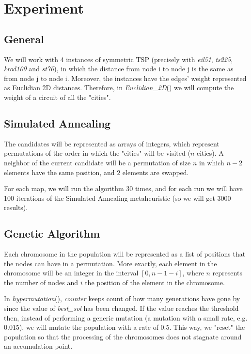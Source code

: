 \documentclass[a4paper]{article}
\begin{document}
\section{Experiment}

\subsection{General}

We will work with 4 instances of symmetric TSP (precisely with \textit{eil51}\cite{instances}, \textit{ts225}\cite{instances}, \textit{krod100}\cite{instances} and \textit{st70}\cite{instances}), in which the distance from node i to node j is the same as from node j to node i. Moreover, the instances have the edges' weight represented as Euclidian 2D distances. Therefore, in {\itshape Euclidian\_2D}() we will compute the weight of a circuit of all the "cities".

\subsection{Simulated Annealing}

The candidates will be represented as arrays of integers, which represent permutations of the order in which the "cities" will be visited ($n$ cities). A neighbor of the current candidate will be a permutation of size $n$ in which $n-2$ elements have the same position, and $2$ elements are swapped.

For each map, we will run the algorithm 30 times, and for each run we will have 100 iterations of the Simulated Annealing metaheuristic (so we will get $3000$ results).

\subsection{Genetic Algorithm}

Each chromosome in the population will be represented as a list of positions that the nodes can have in a permutation. More exactly, each element in the chromosome will be an integer in the interval $[0,n-1-i]$, where $n$ represents the number of nodes and $i$ the position of the element in the chromosome.

In {\itshape hypermutation}(), {\itshape counter} keeps count of how many generations have gone by since the value of {\itshape best\_sol} has been changed. If the value reaches the threshold then, instead of performing a generic mutation (a mutation with a small rate, e.g. $0.015$), we will mutate the population with a rate of $0.5$. This way, we "reset" the population so that the processing of the chromosomes does not stagnate around an accumulation point.
\end{document}
